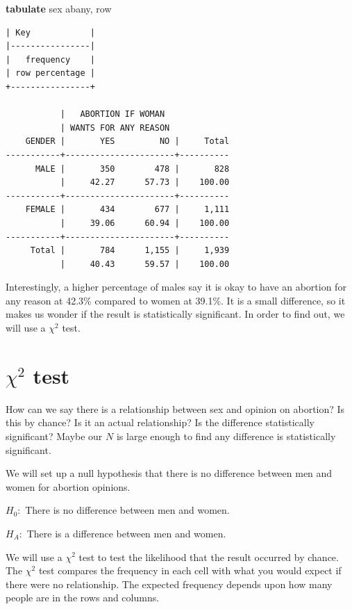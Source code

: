 \documentclass[
]{book}
\newenvironment{Shaded}{\begin{snugshade}}{\end{snugshade}}
\newcommand{\KeywordTok}[1]{\textcolor[rgb]{0.13,0.29,0.53}{\textbf{#1}}}
\newcommand{\NormalTok}[1]{#1}
\newcommand{\OtherTok}[1]{\textcolor[rgb]{0.56,0.35,0.01}{#1}}
\begin{document}
\begin{Shaded}
\begin{Highlighting}[]
\KeywordTok{tabulate}\NormalTok{ sex abany, }\OtherTok{row}
\end{Highlighting}
\end{Shaded}

\begin{verbatim}
| Key            |
|----------------|
|   frequency    |
| row percentage |
+----------------+

           |   ABORTION IF WOMAN
           | WANTS FOR ANY REASON
    GENDER |       YES         NO |     Total
-----------+----------------------+----------
      MALE |       350        478 |       828 
           |     42.27      57.73 |    100.00 
-----------+----------------------+----------
    FEMALE |       434        677 |     1,111 
           |     39.06      60.94 |    100.00 
-----------+----------------------+----------
     Total |       784      1,155 |     1,939 
           |     40.43      59.57 |    100.00 
\end{verbatim}

Interestingly, a higher percentage of males say it is okay to have an abortion for any reason at 42.3\% compared to women at 39.1\%. It is a small difference, so it makes us wonder if the result is statistically significant. In order to find out, we will use a \(\chi^2\) test.

\section{\texorpdfstring{\(\chi^2\) test}{\textbackslash chi\^{}2 test}}\label{chi2-test}

How can we say there is a relationship between sex and opinion on abortion? Is this by chance? Is it an actual relationship? Is the difference statistically significant? Maybe our \(N\) is large enough to find any difference is statistically significant.

We will set up a null hypothesis that there is no difference between men and women for abortion opinions.

\(H_0:\) There is no difference between men and women.

\(H_A:\) There is a difference between men and women.

We will use a \(\chi^2\) test to test the likelihood that the result occurred by chance. The \(\chi^2\) test compares the frequency in each cell with what you would expect if there were no relationship. The expected frequency depends upon how many people are in the rows and columns.
\end{document}
